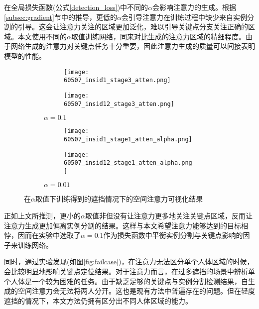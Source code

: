 在全局损失函数(公式\eqref{detection_loss})中不同的$\alpha$会影响注意力的生成。根据\ref{subsec:gradient}节中的推导，更低的$\alpha$会引导注意力在训练过程中缺少来自实例分割的引导。这会让注意力关注的区域更加泛化，难以引导关键点分支关注正确的区域。本文使用不同的$\alpha$取值训练网络，同来对比生成的注意力区域的精细程度。由于网络生成的注意力对关键点任务十分重要，因此注意力生成的质量可以间接表明模型的性能。


\begin{figure}[h]
	\centering
	\begin{subfigure}{0.3\textwidth}
		\centering
		\begin{subfigure}{\linewidth}
			\texttt{[image: 60507\_insid1\_stage3\_atten.png]}
		\end{subfigure}
		\vskip2pt
		\begin{subfigure}{\linewidth}
			\texttt{[image: 60507\_insid12\_stage3\_atten.png]}
		\end{subfigure}
		\caption{$\alpha=0.1$}
	\end{subfigure}
	\begin{subfigure}{0.3\textwidth}
		\centering
		\begin{subfigure}{\linewidth}
			\texttt{[image: 60507\_insid1\_stage1\_atten\_alpha.png]}
		\end{subfigure}
		\vskip2pt
		\begin{subfigure}{\linewidth}
			\texttt{[image: 60507\_insid12\_stage1\_atten\_alpha.png]}
		\end{subfigure}
		\caption{$\alpha=0.01$}
	\end{subfigure}
	\begin{minipage}{0.05\linewidth}
		
		\vskip2cm
	\end{minipage}
	\caption{在$\alpha$取值下训练得到的遮挡情况下的空间注意力可视化结果}
	\label{fig:attenalpha}
\end{figure}

正如上文所推测，更小的$\alpha$取值非但没有让注意力更多地关注关键点区域，反而让注意力生成更加偏离实例分割的结果。这样与本文希望注意力能够达到的目标相悖，因而在实验中选取了$\alpha=0.1$作为损失函数中平衡实例分割与关键点影响的因子来训练网络。

同时，通过实验发现(如图\ref{fig:failcase})，在注意力无法区分单个人体区域的时候，会比较明显地影响关键点定位结果。对于注意力而言，在过多遮挡的场景中辨析单个人体是一个较为困难的任务。由于缺乏足够的关键点与实例分割检测结果，自生成的空间注意力会无法将两人分开。这也是现有方法中普遍存在的问题。但在轻度遮挡的情况下，本文方法仍拥有区分出不同人体区域的能力。

